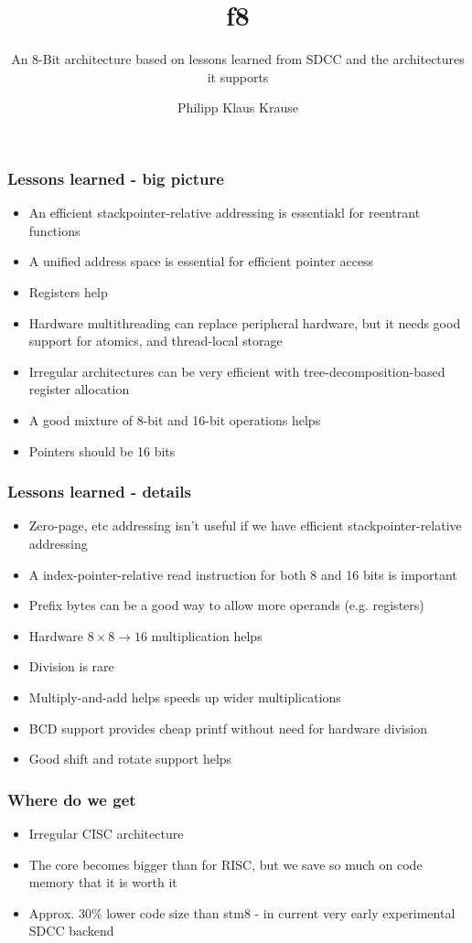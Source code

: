 \documentclass[xcolor=dvipsnames]{beamer}
\title{f8}
\subtitle{An 8-Bit architecture based on lessons learned from SDCC and the architectures it supports}
\author{Philipp Klaus Krause}
\begin{document}
\begin{frame}
	\titlepage
\end{frame}

\begin{frame}
	\frametitle{Lessons learned - big picture}
	\begin{itemize}
		\item An efficient stackpointer-relative addressing is essentiakl for reentrant functions
		\item A unified address space is essential for efficient pointer access
		\item Registers help
		\item Hardware multithreading can replace peripheral hardware, but it needs good support for atomics, and thread-local storage
		\item Irregular architectures can be very efficient with tree-decomposition-based register allocation
		\item A good mixture of 8-bit and 16-bit operations helps
		\item Pointers should be 16 bits
	\end{itemize}
\end{frame}

\begin{frame}
	\frametitle{Lessons learned - details}
	\begin{itemize}
		\item Zero-page, etc addressing isn't useful if we have efficient stackpointer-relative addressing
		\item A index-pointer-relative read instruction for both 8 and 16 bits is important
		\item Prefix bytes can be a good way to allow more operands (e.g. registers)
		\item Hardware $8 \times 8 \to 16$ multiplication helps
		\item Division is rare
		\item Multiply-and-add helps speeds up wider multiplications
		\item BCD support provides cheap printf without need for hardware division
		\item Good shift and rotate support helps
	\end{itemize}
\end{frame}

\begin{frame}
	\frametitle{Where do we get}
	\begin{itemize}
		\item Irregular CISC architecture
		\item The core becomes bigger than for RISC, but we save so much on code memory that it is worth it
		\item Approx. 30\% lower code size than stm8 - in current very early experimental SDCC backend
	\end{itemize}
\end{frame}
\end{document}
